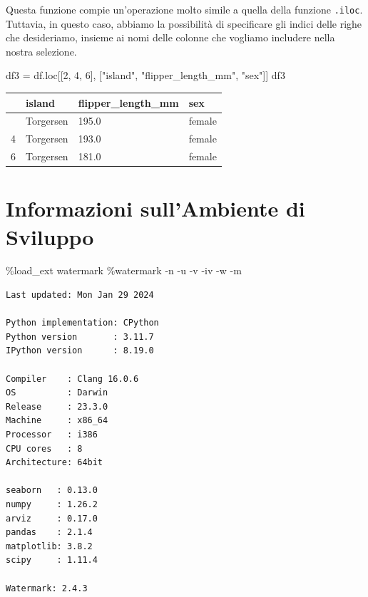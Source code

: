 \documentclass[
  letterpaper,
  krantz2]{{[}./krantz{]}}
\newenvironment{Shaded}{\begin{snugshade}}{\end{snugshade}}
\newcommand{\DecValTok}[1]{\textcolor[rgb]{0.68,0.00,0.00}{#1}}
\newcommand{\NormalTok}[1]{\textcolor[rgb]{0.00,0.23,0.31}{#1}}
\newcommand{\OperatorTok}[1]{\textcolor[rgb]{0.37,0.37,0.37}{#1}}
\newcommand{\StringTok}[1]{\textcolor[rgb]{0.13,0.47,0.30}{#1}}
\begin{document}
Questa funzione compie un'operazione molto simile a quella della
funzione \texttt{.iloc}. Tuttavia, in questo caso, abbiamo la
possibilità di specificare gli indici delle righe che desideriamo,
insieme ai nomi delle colonne che vogliamo includere nella nostra
selezione.

\begin{Shaded}
\begin{Highlighting}[]
\NormalTok{df3 }\OperatorTok{=}\NormalTok{ df.loc[[}\DecValTok{2}\NormalTok{, }\DecValTok{4}\NormalTok{, }\DecValTok{6}\NormalTok{], [}\StringTok{"island"}\NormalTok{, }\StringTok{"flipper\_length\_mm"}\NormalTok{, }\StringTok{"sex"}\NormalTok{]]}
\NormalTok{df3}
\end{Highlighting}
\end{Shaded}

\begin{longtable}[]{@{}llll@{}}
\toprule\noalign{}
& island & flipper\_length\_mm & sex \\
\midrule\noalign{}
\endhead
\bottomrule\noalign{}
\endlastfoot
2 & Torgersen & 195.0 & female \\
4 & Torgersen & 193.0 & female \\
6 & Torgersen & 181.0 & female \\
\end{longtable}

\section{Informazioni sull'Ambiente di
Sviluppo}\label{informazioni-sullambiente-di-sviluppo-5}

\begin{Shaded}
\begin{Highlighting}[]
\OperatorTok{\%}\NormalTok{load\_ext watermark}
\OperatorTok{\%}\NormalTok{watermark }\OperatorTok{{-}}\NormalTok{n }\OperatorTok{{-}}\NormalTok{u }\OperatorTok{{-}}\NormalTok{v }\OperatorTok{{-}}\NormalTok{iv }\OperatorTok{{-}}\NormalTok{w }\OperatorTok{{-}}\NormalTok{m}
\end{Highlighting}
\end{Shaded}

\begin{verbatim}
Last updated: Mon Jan 29 2024

Python implementation: CPython
Python version       : 3.11.7
IPython version      : 8.19.0

Compiler    : Clang 16.0.6 
OS          : Darwin
Release     : 23.3.0
Machine     : x86_64
Processor   : i386
CPU cores   : 8
Architecture: 64bit

seaborn   : 0.13.0
numpy     : 1.26.2
arviz     : 0.17.0
pandas    : 2.1.4
matplotlib: 3.8.2
scipy     : 1.11.4

Watermark: 2.4.3
\end{verbatim}
\end{document}
